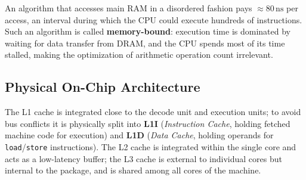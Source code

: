 \begin{table}[H]
\centering
\small
{}
\caption{Quantitative comparison of latency and capacity across memory hierarchy levels.}
\label{tab:gerarchia-memoria-en}
\end{table}

\begin{definition}
An algorithm that accesses main RAM in a disordered fashion pays $\approx 80\,\text{ns}$ per access, an interval during which the CPU could execute hundreds of instructions. Such an algorithm is called \textbf{memory-bound}: execution time is dominated by waiting for data transfer from DRAM, and the CPU spends most of its time stalled, making the optimization of arithmetic operation count irrelevant.
\end{definition}

\subsection{Physical On-Chip Architecture}

The L1 cache is integrated close to the decode unit and execution units; to avoid bus conflicts it is physically split into \textbf{L1I} (\textit{Instruction Cache}, holding fetched machine code for execution) and \textbf{L1D} (\textit{Data Cache}, holding operands for \texttt{load}/\texttt{store} instructions). The L2 cache is integrated within the single core and acts as a low-latency buffer; the L3 cache is external to individual cores but internal to the package, and is shared among all cores of the machine.

